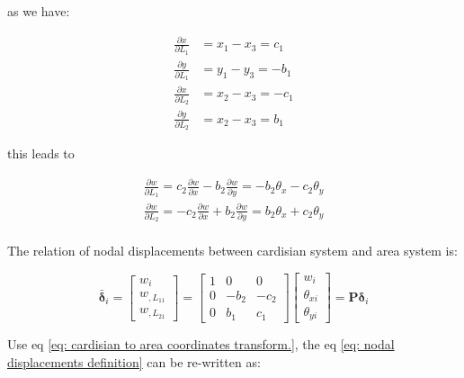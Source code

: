 as we have:

\begin{equation}
\begin{split}
\frac{\partial x}{\partial L_1} &= x_1 - x_3 = c_1 \\
\frac{\partial y}{\partial L_1} &= y_1 - y_3 = -b_1 \\
\frac{\partial x}{\partial L_2} &= x_2 - x_3 = -c_1 \\
\frac{\partial y}{\partial L_2} &= x_2 - x_3 = b_1
\end{split}
\end{equation}

this leads to

\begin{equation}\label{key}
\begin{split}
\frac{\partial w}{\partial L_1} = c_2 \frac{\partial w}{\partial x} - b_2 \frac{\partial w}{\partial y} = -b_2 \theta_x - c_2 \theta_y \\
\frac{\partial w}{\partial L_2} = -c_2 \frac{\partial w}{\partial x} + b_2 \frac{\partial w}{\partial y} = b_2 \theta_x + c_2 \theta_y \\
\end{split}
\end{equation}

The relation of nodal displacements between cardisian system and area system is:

\begin{equation}\label{eq: cardisian to area coordinates transform.}
\bar{\mathbf{\delta}}_i = \begin{bmatrix}
w_i \\ 
w_{,L_{11}} \\ 
w_{,L_{21}}
\end{bmatrix} = \begin{bmatrix}
1 & 0 & 0 \\ 
0 & -b_2 & -c_2 \\ 
0 & b_1 & c_1
\end{bmatrix} \begin{bmatrix}
w_i \\ 
\theta_{xi} \\ 
\theta_{yi}
\end{bmatrix} = \mathbf{P} \mathbf{\delta}_i
\end{equation}

Use eq \ref{eq: cardisian to area coordinates transform.}, the eq \ref{eq: nodal displacements definition} can be re-written as:

